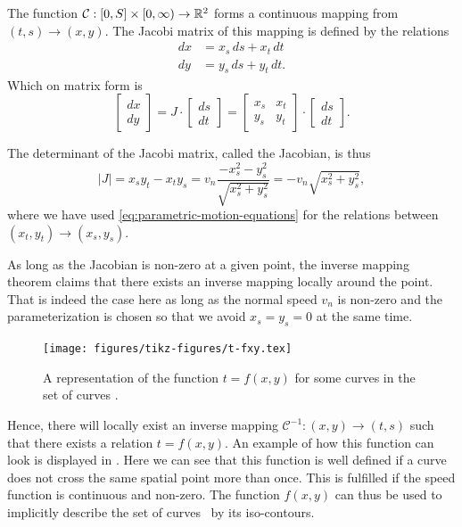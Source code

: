 The function $\mathcal{C} : [0, S]\times [0, \infty) \to \mathbb{R}^2$ forms a continuous mapping from $(t, s) \to (x, y)$. The Jacobi matrix of this mapping is defined by the relations 
\begin{align*}
    dx &= x_s\, ds + x_t\,dt  \\ %
    dy &= y_s \, ds + y_t\, dt . %
\end{align*}
Which on matrix form is
\begin{equation}
    \begin{bmatrix} dx \\ dy \end{bmatrix} = J \cdot \begin{bmatrix} ds \\dt \end{bmatrix} = \begin{bmatrix}
    x_s & x_t \\ y_s & y_t
    \end{bmatrix} \cdot \begin{bmatrix} ds \\dt \end{bmatrix}.
    \label{eq:parametric-jacobi-relation}
\end{equation}

The determinant of the Jacobi matrix, called the Jacobian, is thus
\begin{equation}
    |J|= x_s y_t - x_t y_s = v_n \frac{-x_s^2 - y_s^2}{\sqrt{x_s^2+y_s^2}} = -v_n \sqrt{x_s^2+y_s^2}, 
    \label{eq:jacobi-velocity-relation}
\end{equation}
where we have used \eqref{eq:parametric-motion-equations} for the relations between $(x_t, y_t)\to (x_s, y_s)$. 

As long as the Jacobian is non-zero at a given point, the inverse mapping theorem claims that there exists an inverse mapping locally around the point. That is indeed the case here as long as the normal speed $v_n$ is non-zero and the parameterization is chosen so that we avoid $x_s=y_s=0$ at the same time.

\begin{figure}
    \centering
    \texttt{[image: figures/tikz-figures/t-fxy.tex]}
    \caption[Zero level curves over time]{A representation of the function $t=f(x, y)$ for some curves in the set of curves \curve.}
    \label{fig:t-functionxy}
\end{figure}

Hence, there will locally exist an inverse mapping $\mathcal{C}^{-1} : (x, y) \to (t, s)$ such that there exists a relation $t=f(x, y)$. An example of how this function can look is displayed in . Here we can see that this function is well defined if a curve does not cross the same spatial point more than once. This is fulfilled if the speed function is continuous and non-zero. The function $f(x, y)$ can thus be used to implicitly describe the set of curves \curve\ by its iso-contours. 

